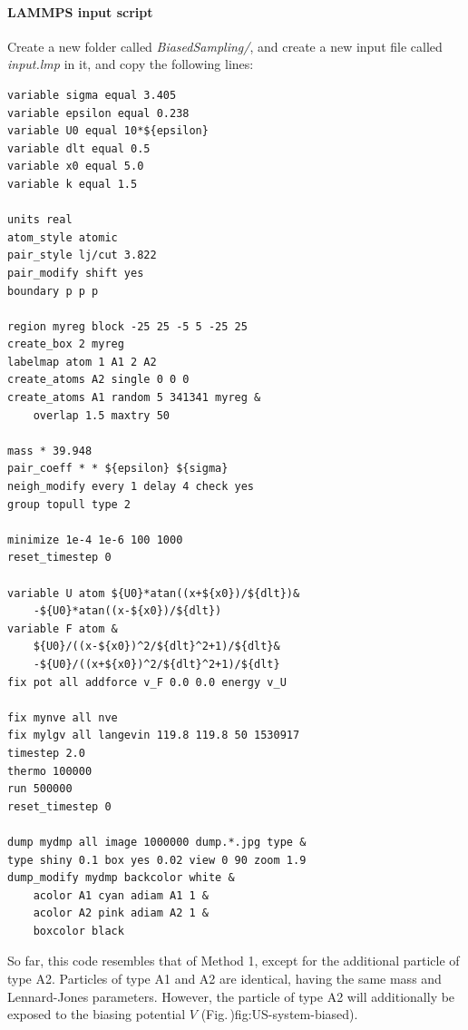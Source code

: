 \documentclass[9pt,tutorial]{livecoms}
\begin{document}
\paragraph{LAMMPS input script}
Create a new folder called \textit{BiasedSampling/}, and create a new input file
called \textit{input.lmp} in it, and copy the following lines:
\begin{lstlisting}
variable sigma equal 3.405
variable epsilon equal 0.238
variable U0 equal 10*${epsilon}
variable dlt equal 0.5
variable x0 equal 5.0
variable k equal 1.5

units real
atom_style atomic
pair_style lj/cut 3.822
pair_modify shift yes
boundary p p p

region myreg block -25 25 -5 5 -25 25
create_box 2 myreg
labelmap atom 1 A1 2 A2
create_atoms A2 single 0 0 0
create_atoms A1 random 5 341341 myreg &
    overlap 1.5 maxtry 50

mass * 39.948
pair_coeff * * ${epsilon} ${sigma}
neigh_modify every 1 delay 4 check yes
group topull type 2

minimize 1e-4 1e-6 100 1000
reset_timestep 0

variable U atom ${U0}*atan((x+${x0})/${dlt})&
    -${U0}*atan((x-${x0})/${dlt})
variable F atom &
    ${U0}/((x-${x0})^2/${dlt}^2+1)/${dlt}&
    -${U0}/((x+${x0})^2/${dlt}^2+1)/${dlt}
fix pot all addforce v_F 0.0 0.0 energy v_U

fix mynve all nve
fix mylgv all langevin 119.8 119.8 50 1530917
timestep 2.0
thermo 100000
run 500000
reset_timestep 0

dump mydmp all image 1000000 dump.*.jpg type &
type shiny 0.1 box yes 0.02 view 0 90 zoom 1.9
dump_modify mydmp backcolor white &
    acolor A1 cyan adiam A1 1 &
    acolor A2 pink adiam A2 1 &
    boxcolor black
\end{lstlisting}
So far, this code resembles that of Method 1, except for the additional particle
of type A2. Particles of type A1 and A2
are identical, having the same mass and Lennard-Jones parameters. However, the
particle of type A2 will additionally be exposed to the biasing potential
$V$ (Fig.\,){fig:US-system-biased}).
\end{document}
